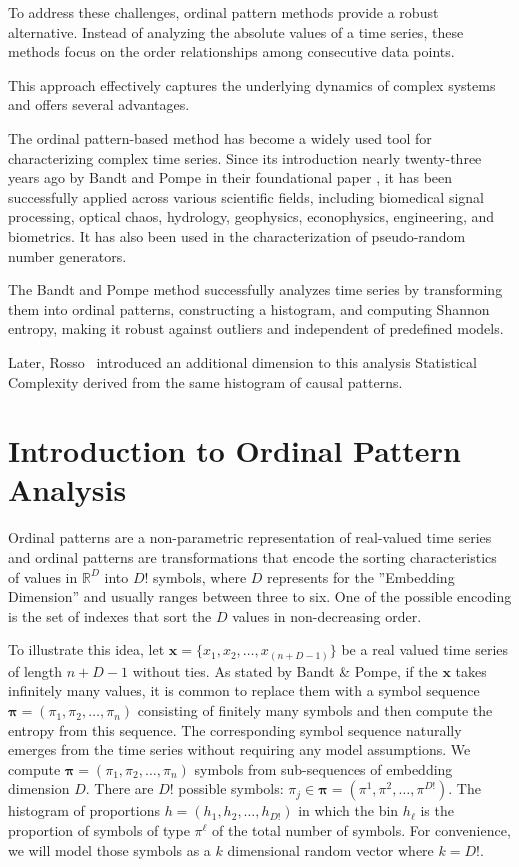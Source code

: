 To address these challenges, ordinal pattern methods provide a robust alternative. Instead of analyzing the absolute values of a time series, these methods focus on the order relationships among consecutive data points.

This approach effectively captures the underlying dynamics of complex systems and offers several advantages.

The ordinal pattern-based method has become a widely used tool for characterizing complex time series. Since its introduction nearly twenty-three years ago by Bandt and Pompe in their foundational paper \cite{PhysRevLett.88.174102}, it has been successfully applied across various scientific fields, including biomedical signal processing, optical chaos, hydrology, geophysics, econophysics, engineering, and biometrics. It has also been used in the characterization of pseudo-random number generators.
   
The Bandt and Pompe method successfully analyzes time series by transforming them into ordinal patterns, constructing a histogram, and computing Shannon entropy, making it robust against outliers and independent of predefined models.

Later, Rosso~\cite{Rosso2007} introduced an additional dimension to this analysis Statistical Complexity derived from the same histogram of causal patterns.

\section*{Introduction to Ordinal Pattern Analysis}

Ordinal patterns are a non-parametric representation of real-valued time series and ordinal patterns are transformations that encode the sorting characteristics of values in $\mathbb{R}^D$ into $D!$ symbols, where $D$ represents for the ''Embedding Dimension'' and usually ranges between three to six. 
One of the possible encoding is the set of indexes that sort the $D$ values in non-decreasing order.
 

To illustrate this idea, let $\bm{x}=\{x_1,x_2, \dots, x_{(n+D-1)}\}$ 
be a real valued time series of length $n+D-1$ without ties. 
As stated by Bandt \& Pompe, if the $\bm{x}$ takes infinitely many values, it is common to replace them with a symbol sequence $\bm{{\pi}}=({\pi}_1, {\pi}_2,\dots, {\pi}_n)$
consisting of finitely many symbols and then compute the entropy from this sequence. 
The corresponding symbol sequence naturally emerges from the time series without requiring any model assumptions. We compute
$\bm{{\pi}}=({\pi}_1, {\pi}_2,\dots, {\pi}_n)$ symbols from sub-sequences of embedding dimension $D$. 
There are $D!$ possible symbols: $\pi_j \in \bm{{\pi}}=({\pi}^1, {\pi}^2,\dots, {\pi}^{D!})$. 
The histogram of proportions $h=(h_1,h_2,\dots, h_{D!})$ in which the bin $h_\ell$ 
is the proportion of symbols of type $\pi^\ell$ of the total number of symbols. 
For convenience, we will model those symbols as a $k$ dimensional random vector where $k=D!$.

